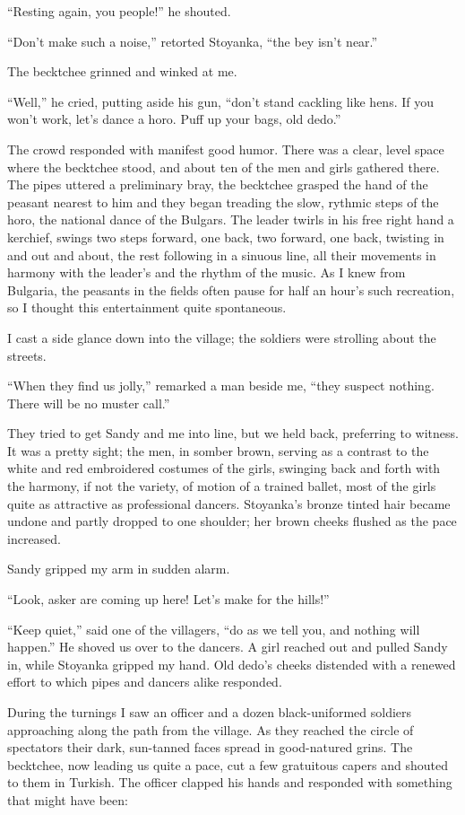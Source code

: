\documentclass[a5paper,12pt]{book}
\begin{document}
“Resting again, you people!” he shouted.

“Don’t make such a noise,” retorted Stoyanka, “the bey isn’t near.”

The becktchee grinned and winked at me.

“Well,” he cried, putting aside his gun, “don’t stand cackling like hens. If you won’t work, let’s dance a horo. Puff up your bags, old dedo.”

The crowd responded with manifest good humor. There was a clear, level space where the becktchee stood, and about ten of the men and girls gathered there. The pipes uttered a preliminary bray, the becktchee grasped the hand of the peasant nearest to him and they began treading the slow, rythmic steps of the horo, the national dance of the Bulgars. The leader twirls in his free right hand a kerchief, swings two steps forward, one back, two forward, one back, twisting in and out and about, the rest following in a sinuous line, all their movements in harmony with the leader’s and the rhythm of the music. As I knew from Bulgaria, the peasants in the fields often pause for half an hour’s such recreation, so I thought this entertainment quite spontaneous.

I cast a side glance down into the village; the soldiers were strolling about the streets.

“When they find us jolly,” remarked a man beside me, “they suspect nothing. There will be no muster call.”

They tried to get Sandy and me into line, but we held back, preferring to witness. It was a pretty sight; the men, in somber brown, serving as a contrast to the white and red embroidered costumes of the girls, swinging back and forth with the harmony, if not the variety, of motion of a trained ballet, most of the girls quite as attractive as professional dancers. Stoyanka’s bronze tinted hair became undone and partly dropped to one shoulder; her brown cheeks flushed as the pace increased.

Sandy gripped my arm in sudden alarm.

“Look, asker are coming up here! Let’s make for the hills!”

“Keep quiet,” said one of the villagers, “do as we tell you, and nothing will happen.” He shoved us over to the dancers. A girl reached out and pulled Sandy in, while Stoyanka gripped my hand. Old dedo’s cheeks distended with a renewed effort to which pipes and dancers alike responded.

During the turnings I saw an officer and a dozen black-uniformed soldiers approaching along the path from the village. As they reached the circle of spectators their dark, sun-tanned faces spread in good-natured grins. The becktchee, now leading us quite a pace, cut a few gratuitous capers and shouted to them in Turkish. The officer clapped his hands and responded with something that might have been:
\end{document}
